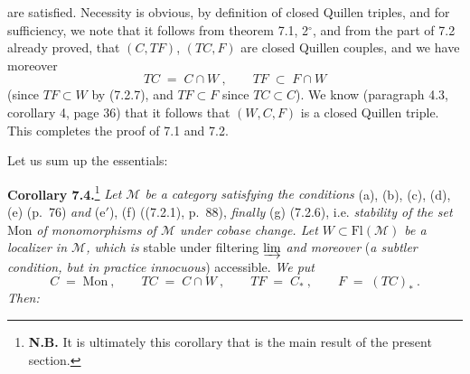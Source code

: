 \documentclass[11pt]{article}
\newcommand{\printedpage}[1]{\marginpar{\footnotesize p.~#1}}
\newcommand{\msp}[1]{\marginpar{\footnotesize [#1]}}
\newcommand{\Mon}{\mathrm{Mon}}
\newcommand{\Fl}{\mathrm{Fl}}
\begin{document}
\printedpage{54}
are satisfied. Necessity is obvious, by definition of closed Quillen triples, and for sufficiency, we note that it follows from theorem 7.1, 2$^\circ$, and from the part of 7.2 already proved, that $(C,TF)$, $(TC,F)$ are closed Quillen couples, and we have moreover
\[
TC \;=\; C\cap W\ , \qquad TF \;\subset\; F\cap W
\]
(since $TF\subset W$ by (7.2.7), and $TF\subset F$ since $TC\subset C$). We know
\msp{page 98}
(paragraph 4.3, corollary 4, page 36) that it follows that $(W,C,F)$ is a closed Quillen triple. This completes the proof of 7.1 and 7.2.

Let us sum up the essentials:

\textbf{Corollary 7.4.}\footnote[35]{\textbf{N.B.} It is ultimately this corollary that is the main result of the present section.} \textit{Let $\mathcal{M}$ be a category satisfying the conditions} (a), (b), (c), (d), (e) (p.~76) \textit{and} (e$'$), (f) ((7.2.1), p.~88), \textit{finally} (g) (7.2.6), i.e. \textit{stability of the set} Mon \textit{of monomorphisms of $\mathcal{M}$ under cobase change. Let $W\subset \Fl(\mathcal{M})$ be a localizer in $\mathcal{M}$, which is} stable under filtering $\varinjlim$ \textit{and moreover} (\textit{a subtler condition, but in practice innocuous}) accessible. \textit{We put}
\[
C \;=\; \Mon\ , \qquad TC \;=\; C\cap W\ , \qquad TF \;=\; C_*\ , \qquad F \;=\; (TC)_*\ .
\]
\textit{Then:}
\end{document}
